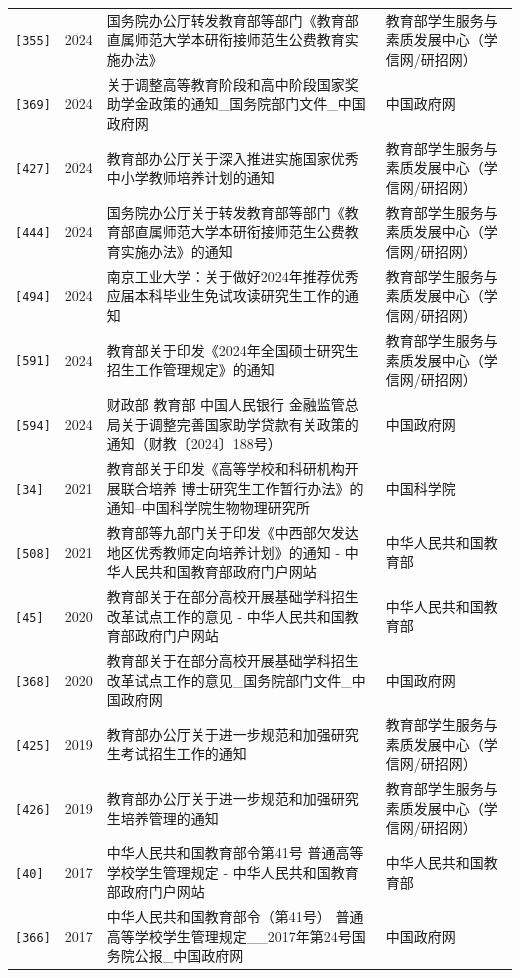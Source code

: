 {\begin{longtable}{p{1.6cm}p{1.1cm}p{6.0cm}p{7.3cm}}
{\texttt{[355]}} & 2024 & 国务院办公厅转发教育部等部门《教育部直属师范大学本研衔接师范生公费教育实施办法》 & 教育部学生服务与素质发展中心（学信网/研招网） \\
{\texttt{[369]}} & 2024 & 关于调整高等教育阶段和高中阶段国家奖助学金政策的通知\_国务院部门文件\_中国政府网 & 中国政府网 \\
{\texttt{[427]}} & 2024 & 教育部办公厅关于深入推进实施国家优秀中小学教师培养计划的通知 & 教育部学生服务与素质发展中心（学信网/研招网） \\
{\texttt{[444]}} & 2024 & 国务院办公厅关于转发教育部等部门《教育部直属师范大学本研衔接师范生公费教育实施办法》的通知 & 教育部学生服务与素质发展中心（学信网/研招网） \\
{\texttt{[494]}} & 2024 & 南京工业大学：关于做好2024年推荐优秀应届本科毕业生免试攻读研究生工作的通知 & 教育部学生服务与素质发展中心（学信网/研招网） \\
{\texttt{[591]}} & 2024 & 教育部关于印发《2024年全国硕士研究生招生工作管理规定》的通知 & 教育部学生服务与素质发展中心（学信网/研招网） \\
{\texttt{[594]}} & 2024 & 财政部 教育部 中国人民银行 金融监管总局关于调整完善国家助学贷款有关政策的通知（财教〔2024〕188号） & 中国政府网 \\
{\texttt{[34]}} & 2021 & 教育部关于印发《高等学校和科研机构开展联合培养 博士研究生工作暂行办法》的通知--中国科学院生物物理研究所 & 中国科学院 \\
{\texttt{[508]}} & 2021 & 教育部等九部门关于印发《中西部欠发达地区优秀教师定向培养计划》的通知 - 中华人民共和国教育部政府门户网站 & 中华人民共和国教育部 \\
{\texttt{[45]}} & 2020 & 教育部关于在部分高校开展基础学科招生改革试点工作的意见 - 中华人民共和国教育部政府门户网站 & 中华人民共和国教育部 \\
{\texttt{[368]}} & 2020 & 教育部关于在部分高校开展基础学科招生改革试点工作的意见\_国务院部门文件\_中国政府网 & 中国政府网 \\
{\texttt{[425]}} & 2019 & 教育部办公厅关于进一步规范和加强研究生考试招生工作的通知 & 教育部学生服务与素质发展中心（学信网/研招网） \\
{\texttt{[426]}} & 2019 & 教育部办公厅关于进一步规范和加强研究生培养管理的通知 & 教育部学生服务与素质发展中心（学信网/研招网） \\
{\texttt{[40]}} & 2017 & 中华人民共和国教育部令第41号 普通高等学校学生管理规定 - 中华人民共和国教育部政府门户网站 & 中华人民共和国教育部 \\
{\texttt{[366]}} & 2017 & 中华人民共和国教育部令（第41号） 普通高等学校学生管理规定\_\_2017年第24号国务院公报\_中国政府网 & 中国政府网 \\

\end{longtable}}
